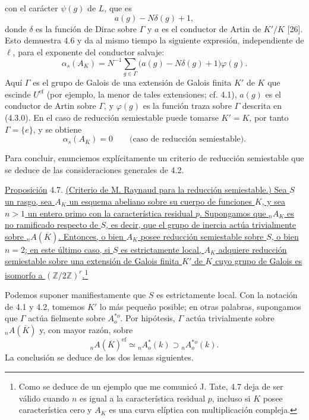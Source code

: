 con el carácter $\psi(g)$ de $L$, que es
\[
 a(g)-N\delta(g)+1,
\]
donde $\delta$ es la función de Dirac sobre $\Gamma$ y $a$ es el
conductor de Artin de $K'/K$ [26]. Esto demuestra 4.6 y da al mismo
tiempo la siguiente expresión, independiente de $\ell$, para el
exponente del conductor salvaje:
\begin{equation}\tag{4.6.2}
 \alpha_s(A_K)
 =N^{-1}\sum_{g\in\Gamma}
   \bigl(a(g)-N\delta(g)+1\bigr)\varphi(g).
\end{equation}
Aquí $\Gamma$ es el grupo de Galois de una extensión de Galois finita
$K'$ de $K$ que escinde $U^{\mathrm{ef}}$ (por ejemplo, la menor de
tales extensiones; cf. 4.1), $a(g)$ es el conductor de Artin sobre
$\Gamma$, y $\varphi(g)$ es la función traza sobre $\Gamma$ descrita
en (4.3.0). En el caso de reducción semiestable puede tomarse $K'=K$,
por tanto $\Gamma=\{e\}$, y se obtiene
\begin{equation}\tag{4.6.3}
 \alpha_s(A_K)=0
 \qquad\text{(caso de reducción semiestable).}
\end{equation}

Para concluir, enunciemos explícitamente un criterio de reducción
semiestable que se deduce de las consideraciones generales de 4.2.

\medskip
\noindent
\underline{Proposición} 4.7. \underline{(Criterio de M. Raynaud para la
reducción semiestable.) Sea $S$ un rasgo, sea $A_K$ un esquema abeliano
sobre su cuerpo de funciones $K$, y sea $n>1$ un entero primo con la
característica residual $p$. Supongamos que ${}_nA_K$ es no ramificado
respecto de $S$, es decir, que el grupo de inercia actúa trivialmente
sobre ${}_nA(\overline K)$. Entonces, o bien $A_K$ posee reducción
semiestable sobre $S$, o bien $n=2$; en este último caso, si $S$ es
estrictamente local, $A_K$ adquiere reducción semiestable sobre una
extensión de Galois finita $K'$ de $K$ cuyo grupo de Galois es isomorfo
a $(\mathbb Z/2\mathbb Z)^r$.}\footnote{Como se deduce de un ejemplo
que me comunicó J. Tate, 4.7 deja de ser válido cuando $n$ es igual a
la característica residual $p$, incluso si $K$ posee característica
cero y $A_K$ es una curva elíptica con multiplicación compleja.}

Podemos suponer manifiestamente que $S$ es estrictamente local. Con la
notación de 4.1 y 4.2, tomemos $K'$ lo más pequeño posible; en otras
palabras, supongamos que $\Gamma$ actúa fielmente sobre $A^{*o}_o$. Por
hipótesis, $\Gamma$ actúa trivialmente sobre ${}_nA(\overline K)$ y,
con mayor razón, sobre
\[
 {}_nA(\overline K)^{\mathrm{ef}}
 \simeq{}_nA^*_o(k)\supset{}_nA^{*o}_o(k).
\]
La conclusión se deduce de los dos lemas siguientes.

